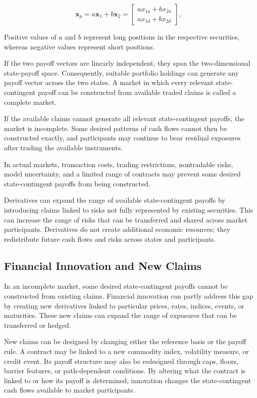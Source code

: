 \begin{equation}
\mathbf{x}_p
=
a\mathbf{x}_1+b\mathbf{x}_2
=
\begin{bmatrix}
ax_{1u}+bx_{2u}\\
ax_{1d}+bx_{2d}
\end{bmatrix},
\label{eq:ch11-spanning-portfolio}
\end{equation}

Positive values of $a$ and $b$ represent long
positions in the respective securities, whereas
negative values represent short positions.

If the two payoff vectors are linearly independent,
they span the two-dimensional state-payoff space.
Consequently, suitable portfolio holdings can
generate any payoff vector across the two states.
A market in which every relevant state-contingent
payoff can be constructed from available traded
claims is called a complete market.

If the available claims cannot generate all relevant state-contingent payoffs, the market is incomplete. Some desired patterns of cash flows cannot then be constructed exactly, and participants may continue to bear residual exposures after trading the available instruments.

In actual markets, transaction costs, trading restrictions, nontradable risks, model uncertainty, and a limited range of contracts may prevent some desired state-contingent payoffs from being constructed.

Derivatives can expand the range of available state-contingent payoffs by introducing claims linked to risks not fully represented by existing securities. This can increase the range of risks that can be transferred and shared across market participants. Derivatives do not create additional economic resources; they redistribute future cash flows and risks across states and participants.

\subsection{Financial Innovation and New Claims}

In an incomplete market, some desired state-contingent payoffs cannot be constructed from existing claims. Financial innovation can partly address this gap by creating new derivatives linked to particular prices, rates, indices, events, or maturities. These new claims can expand the range of exposures that can be transferred or hedged.

New claims can be designed by changing either the reference basis or the payoff rule. A contract may be linked to a new commodity index, volatility measure, or credit event. Its payoff structure may also be redesigned through caps, floors, barrier features, or path-dependent conditions. By altering what the contract is linked to or how its payoff is determined, innovation changes the state-contingent cash flows available to market participants.

